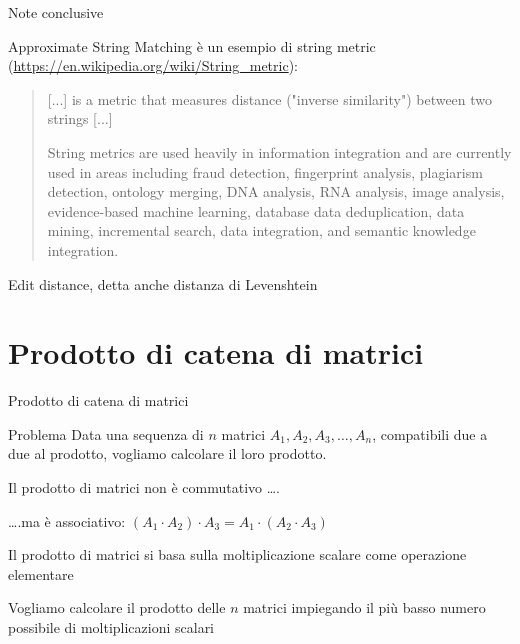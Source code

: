 \begin{frame}{Note conclusive}

Approximate String Matching è un esempio di \alert{string metric}
(\url{https://en.wikipedia.org/wiki/String_metric}):

\begingroup
\small
\begin{quote}
[...] \alert{is a metric that measures distance ("inverse similarity") between two strings} [...]

String metrics are used heavily in information integration and are currently used in areas including fraud detection, fingerprint analysis, plagiarism detection, ontology merging, DNA analysis, RNA analysis, image analysis, evidence-based machine learning, database data deduplication, data mining, incremental search, data integration, and semantic knowledge integration.
\end{quote}
\endgroup

\bigskip
{}
\BIL
\item \alert{Edit distance}, detta anche \alert{distanza di Levenshtein}
\EIL
\end{frame}


\section{Prodotto di catena di matrici}


\begin{frame}{Prodotto di catena di matrici}

\begin{block}{Problema}
Data una sequenza di $n$ matrici $A_1, A_2, A_3, \ldots, A_n$, compatibili due a due al prodotto, vogliamo calcolare il loro prodotto.
\BIL
\item  Il prodotto di matrici non è \alert{commutativo} \ldots .
\item  \ldots .ma è \alert{associativo}: $(A_1 \cdot A_2) \cdot A_3 = A_1 \cdot (A_2 \cdot A_3)$ 
\EIL
\end{block}

\bigskip
{}
\BIL
\item Il prodotto di matrici si basa sulla \alert{moltiplicazione scalare} come operazione elementare
\item Vogliamo calcolare il prodotto delle $n$ matrici impiegando il più basso numero possibile di moltiplicazioni scalari
\EIL

\end{frame}


